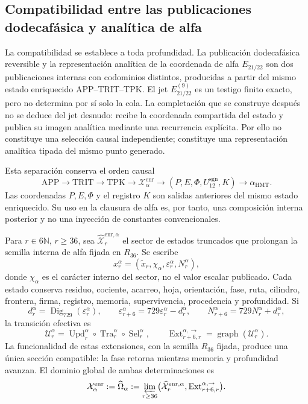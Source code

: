 \subsection{Compatibilidad entre las publicaciones dodecafásica y analítica de alfa}
\label{subsec:alpha-limite-dos-vias}

La compatibilidad se establece a toda profundidad. La publicación
dodecafásica reversible y la representación analítica de la
coordenada de alfa
\(E_{21/22}\) son dos publicaciones internas con codominios distintos,
producidas a partir del mismo estado enriquecido APP--TRIT--TPK. El jet
\(E_{21/22}^{(9)}\) es un testigo finito exacto, pero no determina por sí solo
la cola. La completación que se construye después no se deduce del jet
desnudo: recibe la coordenada compartida del estado y publica su imagen
analítica mediante una recurrencia explícita. Por ello no constituye una
selección causal independiente; constituye una representación analítica
tipada del mismo punto generado.

Esta separación conserva el orden causal
\[
 \mathrm{APP}\longrightarrow\mathrm{TRIT}\longrightarrow\mathrm{TPK}
 \longrightarrow\mathcal X_{\alpha}^{\mathrm{enr}}
 \longrightarrow (P,E,\Phi,U_{12}^{\mathrm{sgn}},K)
 \longrightarrow\alpha_{\mathrm{HMT}}.
\]
Las coordenadas \(P,E,\Phi\) y el registro \(K\) son salidas anteriores del
mismo estado enriquecido. Su uso en la clausura de alfa es, por tanto, una
composición interna posterior y no una inyección de constantes
convencionales.

Para \(r\in6\mathbb N\), \(r\ge36\), sea
\(\widehat{\mathcal X}^{\mathrm{enr},\alpha}_r\) el sector de estados
truncados que prolongan la semilla interna de alfa fijada en \(R_{36}\). Se
escribe
\[
 x_r^\alpha=(\widetilde x_r,\chi_\alpha,
              \varepsilon_r^\alpha,N_r^\alpha),
\]
donde \(\chi_\alpha\) es el carácter interno del sector, no el valor escalar
publicado. Cada estado conserva residuo, cociente, acarreo, hoja, orientación,
fase, ruta, cilindro, frontera, firma, registro, memoria, supervivencia,
procedencia y profundidad. Si
\[
 d_r^\alpha=\operatorname{Dig}_{729}(\varepsilon_r^\alpha),\qquad
 \varepsilon_{r+6}^\alpha=729\varepsilon_r^\alpha-d_r^\alpha,
 \qquad N_{r+6}^\alpha=729N_r^\alpha+d_r^\alpha,
\]
la transición efectiva es
\[
 \mathcal U_r^\alpha=
 \operatorname{Upd}_r^\alpha\circ
 \operatorname{Tra}_r^\alpha\circ
 \operatorname{Sel}_r^\alpha,
 \qquad
 \operatorname{Ext}^{\alpha,\to}_{r+6,r}
 =\operatorname{graph}(\mathcal U_r^\alpha).
\]
La funcionalidad de estas extensiones, con la semilla \(R_{36}\) fijada,
produce una única sección compatible: la fase retorna mientras memoria y
profundidad avanzan. El dominio global de ambas determinaciones es
\begin{equation}
 \mathcal X_\alpha^{\mathrm{enr}}:=\widehat\Omega_\alpha
 :=\varprojlim_{r\ge36}
 \bigl(\widehat{\mathcal X}^{\mathrm{enr},\alpha}_r,
       \operatorname{Ext}^{\alpha,\to}_{r+6,r}\bigr).
 \label{eq:alpha-dominio-enriquecido-completo}
\end{equation}

